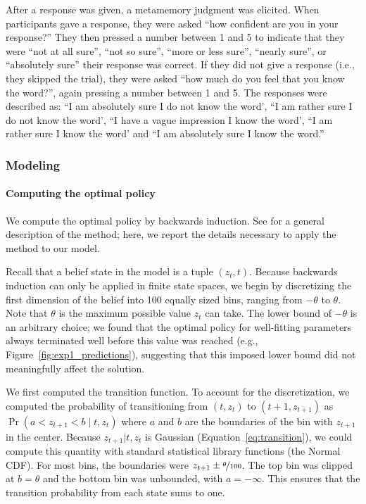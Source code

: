 After a response was given, a metamemory judgment was elicited. When participants gave a response, they were asked ``how confident are you in your response?'' They then pressed a number between 1 and 5 to indicate that they were ``not at all sure'', ``not so sure'', ``more or less sure'', ``nearly sure'', or ``absolutely sure'' their response was correct. If they did not give a response (i.e., they skipped the trial), they were asked ``how much do you feel that you know the word?'', again pressing a number between 1 and 5. The responses were described as: ``I am absolutely sure I do not know the word', ``I am rather sure I do not know the word', ``I have a vague impression I know the word', ``I am rather sure I know the word' and ``I am absolutely sure I know the word.'' 

\subsubsection{Modeling}

\paragraph{Computing the optimal policy}

We compute the optimal policy by backwards induction. See \citet{puterman2014markov} for a general description of the method; here, we report the details necessary to apply the method to our model.

Recall that a belief state in the model is a tuple $(z_t, t)$. Because backwards induction can only be applied in finite state spaces, we begin by discretizing the first dimension of the belief into 100 equally sized bins, ranging from $-\theta$ to $\theta$. Note that $\theta$ is the maximum possible value $z_t$ can take. The lower bound of $-\theta$ is an arbitrary choice; we found that the optimal policy for well-fitting parameters always terminated well before this value was reached (e.g., Figure~\ref{fig:exp1_predictions}), suggesting that this imposed lower bound did not meaningfully affect the solution.

We first computed the transition function. To account for the discretization, we computed the probability of transitioning from $(t, z_t)$ to $(t+1, z_{t+1})$ as $\Pr(a < z_{t+1} < b \mid t, z_t)$ where $a$ and $b$ are the boundaries of the bin with $z_{t+1}$ in the center. Because $z_{t+1}|t,z_t$ is Gaussian (Equation~\ref{eq:transition}), we could compute this quantity with standard statistical library functions (the Normal CDF). For most bins, the boundaries were $z_{t+1} \pm \nicefrac{\theta}{100}$. The top bin was clipped at $b = \theta$ and the bottom bin was unbounded, with $a = -\infty$. This ensures that the transition probability from each state sums to one.

